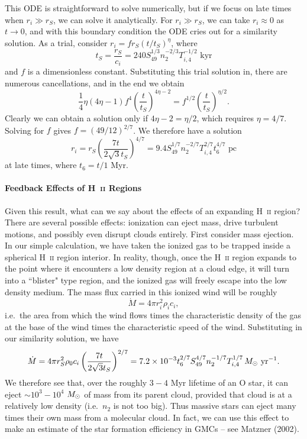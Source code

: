 This ODE is straightforward to solve numerically, but if we focus on late times when $r_i \gg r_S$, we can solve it analytically. For $r_i \gg r_S$, we can take $r_i \approx 0$ as $t\rightarrow 0$, and with this boundary condition the ODE cries out for a similarity solution. As a trial, consider $r_i = f r_S (t/t_S)^\eta$, where 
\begin{equation}
t_S = \frac{r_S}{c_i} = 240  S_{49}^{1/3} n_2^{-2/3} T_{i,4}^{-1/2}\mbox{ kyr}
\end{equation}
and $f$ is a dimensionless constant. Substituting this trial solution in, there are numerous cancellations, and in the end we obtain
\begin{equation}
\frac{1}{4} \eta (4\eta-1) f^4 \left(\frac{t}{t_S}\right)^{4\eta-2} = f^{1/2} \left(\frac{t}{t_S}\right)^{\eta/2}.
\end{equation}
Clearly we can obtain a solution only if $4\eta-2 = \eta/2$, which requires $\eta = 4/7$. Solving for $f$ gives $f=(49/12)^{2/7}$. We therefore have a solution
\begin{equation}
r_i = r_S \left(\frac{7 t}{2\sqrt{3} t_S}\right)^{4/7} = 9.4 S_{49}^{1/7} n_2^{-2/7} T_{i,4}^{2/7} t_6^{4/7}\mbox{ pc}
\end{equation}
at late times, where $t_6 = t/1$ Myr.

\paragraph{Feedback Effects of H~\textsc{ii} Regions}

Given this result, what can we say about the effects of an expanding H~\textsc{ii} region? There are several possible effects: ionization can eject mass, drive turbulent motions, and possibly even disrupt clouds entirely. First consider mass ejection. In our simple calculation, we have taken the ionized gas to be trapped inside a spherical H~\textsc{ii} region interior. In reality, though, once the H~\textsc{ii} region expands to the point where it encounters a low density region at a cloud edge, it will turn into a ``blister" type region, and the ionized gas will freely escape into the low density medium. The mass flux carried in this ionized wind will be roughly
\begin{equation}
\dot{M} = 4\pi r_i^2 \rho_i c_i,
\end{equation}
i.e.\ the area from which the wind flows times the characteristic density of the gas at the base of the wind times the characteristic speed of the wind. Substituting in our similarity solution, we have
\begin{equation}
\dot{M} = 4\pi r_S^2 \rho_0 c_i \left(\frac{7t}{2\sqrt{3} t_S}\right)^{2/7} = 7.2\times 10^{-3} t_6^{2/7} S_{49}^{4/7} n_2^{-1/7} T_{i,4}^{1/7}\,M_{\odot}\mbox{ yr}^{-1}.
\end{equation}
We therefore see that, over the roughly $3-4$ Myr lifetime of an O star, it can eject $\sim 10^3 - 10^4$ $M_{\odot}$ of mass from its parent cloud, provided that cloud is at a relatively low density (i.e.\ $n_2$ is not too big). Thus massive stars can eject many times their own mass from a molecular cloud. In fact, we can use this effect to make an estimate of the star formation efficiency in GMCs -- see Matzner (2002).

